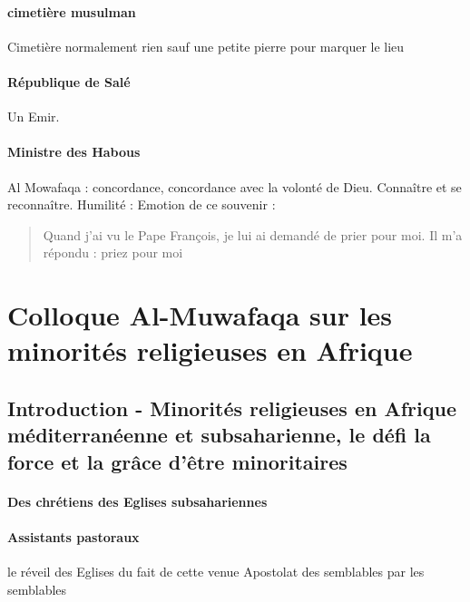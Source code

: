 \paragraph{cimetière musulman}
Cimetière normalement rien sauf une petite pierre pour marquer le lieu 

\paragraph{République de Salé} Un Emir. 





 
\paragraph{Ministre des Habous} Al Mowafaqa : concordance, concordance avec la volonté de Dieu. Connaître et se reconnaître.
Humilité : Emotion de ce souvenir : 
\begin{quote}
Quand j’ai vu le Pape François, je lui ai demandé de prier pour moi.  Il m’a répondu : priez pour moi
\end{quote}

\paragraph{}

\section{Colloque Al-Muwafaqa sur les minorités  religieuses en Afrique}

\subsection{Introduction  - Minorités religieuses en Afrique méditerranéenne et subsaharienne, le défi la force et la grâce d’être minoritaires}
\paragraph{Des chrétiens des Eglises subsahariennes}
\paragraph{Assistants pastoraux} le réveil des Eglises du fait de cette venue
Apostolat des semblables par les semblables

